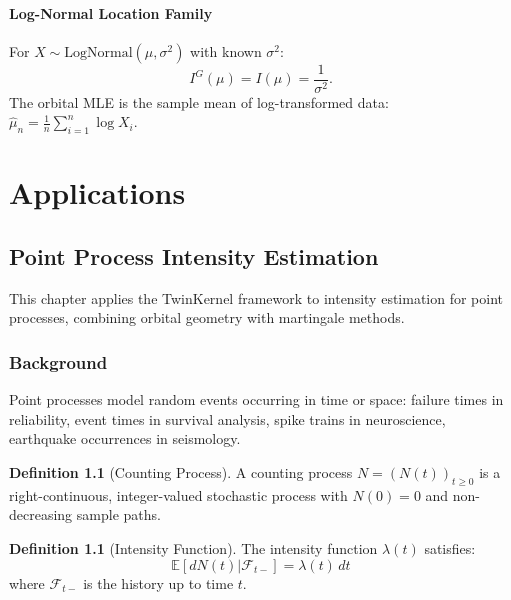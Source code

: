 \documentclass[11pt,twoside,openright]{book}
\theoremstyle{plain}
\theoremstyle{definition}
\newtheorem{definition}[theorem]{Definition}
\theoremstyle{remark}
\newcommand{\calF}{\mathcal{F}}
\newcommand{\E}{\mathbb{E}}
\begin{document}
\subsection{Log-Normal Location Family}

For $X \sim \text{LogNormal}(\mu, \sigma^2)$ with known $\sigma^2$:
\[
I^G(\mu) = I(\mu) = \frac{1}{\sigma^2}.
\]
The orbital MLE is the sample mean of log-transformed data: $\hat{\mu}_n = \frac{1}{n}\sum_{i=1}^n \log X_i$.


\part{Applications}
\label{part:applications}


\chapter{Point Process Intensity Estimation}
\label{ch:point-processes}

This chapter applies the TwinKernel framework to intensity estimation for point processes, combining orbital geometry with martingale methods.

\section{Background}

Point processes model random events occurring in time or space: failure times in reliability, event times in survival analysis, spike trains in neuroscience, earthquake occurrences in seismology.

\begin{definition}[Counting Process]
A counting process $N = (N(t))_{t \geq 0}$ is a right-continuous, integer-valued stochastic process with $N(0) = 0$ and non-decreasing sample paths.
\end{definition}

\begin{definition}[Intensity Function]
The intensity function $\lambda(t)$ satisfies:
\[
\E[dN(t) | \calF_{t-}] = \lambda(t) \, dt
\]
where $\calF_{t-}$ is the history up to time $t$.
\end{definition}
\end{document}
